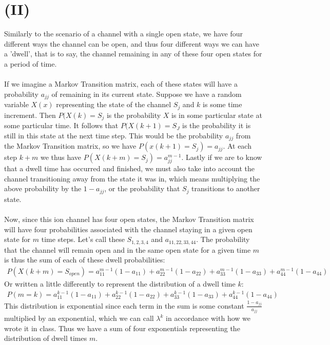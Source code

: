 \documentclass{article}
\begin{document}
\section*{\textbf{(II)}}
Similarly to the scenario of a channel with a single open state, we have four different ways the channel can be open, and thus four different ways we can have a 'dwell', that is to say, the channel remaining in any of these four open states for a period of time.\\
\\
If we imagine a Markov Transition matrix, each of these states will have a probability $a_{jj}$ of remaining in its current state. Suppose we have a random variable $X(x)$ representing the state of the channel $S_j$ and $k$ is some time increment. Then $P(X(k) = S_j$ is the probability $X$ is in some particular state at some particular time. It follows that $P(X(k+1) = S_J$ is the probability it is still in this state at the next time step. This would be the probability $a_{jj}$ from the Markov Transition matrix, so we have $P(x(k+1) = S_j) = a_{jj}$. At each step $k+m$ we thus have $P(X(k+m) = S_j) = a_{jj}^{m-1}$. Lastly if we are to know that a dwell time has occurred and finished, we must also take into account the channel transitioning away from the state it was in, which means multiplying the above probability by the $1-a_{jj}$, or the probability that $S_j$ transitions to another state. \\
\\
Now, since this ion channel has four open states, the Markov Transition matrix will have four probabilities associated with the channel staying in a given open state for $m$ time steps. Let's call these $S_{1,2,3,4}$ and $a_{11,22,33,44}$. The probability that the channel will remain open and in the same open state for a given time $m$ is thus the sum of each of these dwell probabilities:
\begin{equation}
\begin{aligned}
P(X(k+m) = S_{open}) = a_{11}^{m-1}(1-a_{11})+ a_{22}^{m-1}(1-a_{22})+ a_{33}^{m-1}(1-a_{33})+ a_{44}^{m-1}(1-a_{44})
 \end{aligned}
\end{equation}
Or written a little differently to represent the distribution of a dwell time $k$:
\begin{equation}
\begin{aligned}
P(m = k) = a_{11}^{k-1}(1-a_{11})+ a_{22}^{k-1}(1-a_{22})+ a_{33}^{k-1}(1-a_{33})+ a_{44}^{k-1}(1-a_{44})
 \end{aligned}
\end{equation}
This distribution is exponential since each term in the sum is some constant $\frac{1-a_{jj}}{a_{jj}}$ multiplied by an exponential, which we can call $\lambda^k$ in accordance with how we wrote it in class. Thus we have a sum of four exponentials representing the distribution of dwell times $m$.
\end{document}
